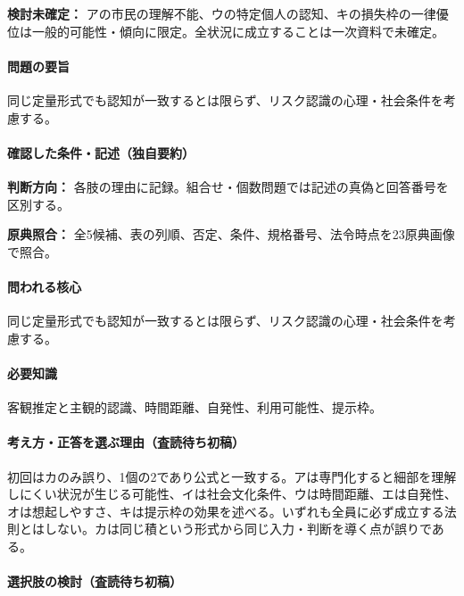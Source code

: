 \par\textbf{検討未確定：} アの市民の理解不能、ウの特定個人の認知、キの損失枠の一律優位は一般的可能性・傾向に限定。全状況に成立することは一次資料で未確定。

\paragraph{問題の要旨} 同じ定量形式でも認知が一致するとは限らず、リスク認識の心理・社会条件を考慮する。

\paragraph{確認した条件・記述（独自要約）}\mbox{}\par

\noindent\textbf{判断方向：} 各肢の理由に記録。組合せ・個数問題では記述の真偽と回答番号を区別する。\par

\noindent\textbf{原典照合：} 全5候補、表の列順、否定、条件、規格番号、法令時点を23原典画像で照合。\par

\paragraph{問われる核心} 同じ定量形式でも認知が一致するとは限らず、リスク認識の心理・社会条件を考慮する。

\paragraph{必要知識} 客観推定と主観的認識、時間距離、自発性、利用可能性、提示枠。

\paragraph{考え方・正答を選ぶ理由（査読待ち初稿）} 初回はカのみ誤り、1個の2であり公式と一致する。アは専門化すると細部を理解しにくい状況が生じる可能性、イは社会文化条件、ウは時間距離、エは自発性、オは想起しやすさ、キは提示枠の効果を述べる。いずれも全員に必ず成立する法則とはしない。カは同じ積という形式から同じ入力・判断を導く点が誤りである。

\paragraph{選択肢の検討（査読待ち初稿）}\mbox{}\par

